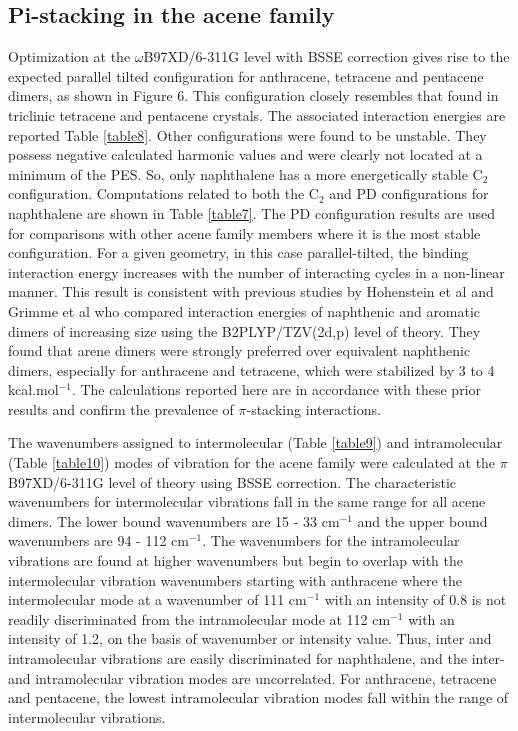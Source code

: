 \subsection{Pi-stacking in the acene family}

Optimization at the $\omega$B97XD/6-311G level with BSSE correction gives rise to the expected parallel tilted configuration \cite{brock1990temperature} for anthracene, tetracene and pentacene dimers, as shown in Figure 6. This configuration closely resembles that found in triclinic tetracene\cite{campbell1962crystal} and pentacene\cite{holmes1999nature} crystals. The associated interaction energies are reported Table \ref{table8}.  Other configurations were found to be unstable. They possess negative calculated harmonic values and were clearly not located at a minimum of the PES. So, only naphthalene has a more energetically stable C$_{2}$ configuration. Computations related to both the C$_{2}$ and PD configurations for naphthalene are shown in Table \ref{table7}. The PD configuration results are used for comparisons with other acene family members where it is the most stable configuration.
For a given geometry, in this case parallel-tilted, the binding interaction energy increases with the number of interacting cycles in a non-linear manner. This result is consistent with previous studies by Hohenstein et al \cite{hohenstein2010density} and Grimme et al\cite{grimme2008special} who compared interaction energies of naphthenic and aromatic dimers of increasing size using the B2PLYP/TZV(2d,p) level of theory. They found that arene dimers were strongly preferred over equivalent naphthenic dimers, especially for anthracene and tetracene, which were stabilized by 3 to 4 kcal.mol$^{-1}$. The calculations reported here are in accordance with these prior results and confirm the prevalence of $\pi$-stacking interactions.  

The wavenumbers assigned to intermolecular (Table \ref{table9}) and intramolecular (Table \ref{table10}) modes of vibration for the acene family were calculated at the $\pi$B97XD/6-311G level of theory using BSSE correction. The characteristic wavenumbers for intermolecular vibrations fall in the same range for all  acene dimers. The lower bound wavenumbers are 15 - 33 cm$^{-1}$ and the upper bound wavenumbers are 94 - 112 cm$^{-1}$. The wavenumbers for the intramolecular vibrations are found at higher wavenumbers but begin to overlap with the intermolecular vibration wavenumbers starting with anthracene where the intermolecular mode at a wavenumber of 111 cm$^{-1}$ with an intensity of 0.8 is not readily discriminated from the intramolecular mode at 112 cm$^{-1}$ with an intensity of 1.2, on the basis of wavenumber or intensity value. Thus, inter and intramolecular vibrations are easily discriminated for naphthalene, and the inter- and intramolecular vibration modes are uncorrelated. For anthracene, tetracene and pentacene, the lowest intramolecular vibration modes fall within the range of intermolecular vibrations.\\ 

